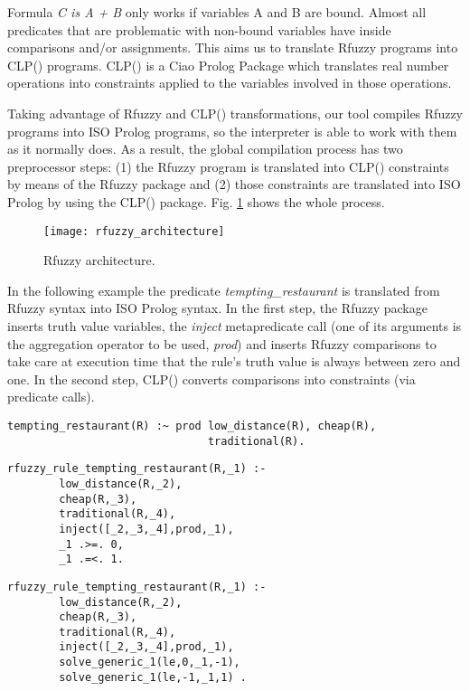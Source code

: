 \documentclass[runningheads,a4paper]{llncs}
\begin{document}
Formula {\it C is A + B} only works if variables A and B are bound.
Almost all predicates that are problematic with non-bound 
variables have inside comparisons and/or assignments. 
This aims us to translate Rfuzzy programs into CLP() 
programs. 
CLP() is a Ciao Prolog Package which translates real
number operations into constraints applied to the variables 
involved in those operations. 

Taking advantage of Rfuzzy and CLP() transformations, 
our tool compiles Rfuzzy programs into ISO Prolog programs,
so the interpreter is able to work with them as it normally does.
As a result, the global compilation process has two 
preprocessor steps:
(1) the Rfuzzy program is translated into CLP() 
constraints by means of the Rfuzzy package and 
(2) those constraints are translated into ISO Prolog by using 
the CLP() package. 
Fig. \ref{fig:rfuzzy_architecture} shows the whole process.
\begin{figure}
\centering
\texttt{[image: rfuzzy\_architecture]} 
\caption{Rfuzzy architecture.}
\label{fig:rfuzzy_architecture}
\end{figure}


In the following example the predicate {\it tempting\_restaurant}
is translated from Rfuzzy syntax into ISO Prolog syntax.
In the first step, the Rfuzzy package inserts truth value variables, 
the {\it inject} metapredicate call
(one of its arguments is the aggregation operator to be used, 
{\it prod}) 
and inserts Rfuzzy comparisons to take care at execution time 
that the rule's truth value is always between zero and one.
In the second step, CLP() converts comparisons into 
constraints (via predicate calls).

\begin{verbatim}
tempting_restaurant(R) :~ prod low_distance(R), cheap(R), 
                               traditional(R).
\end{verbatim}

\begin{verbatim}
rfuzzy_rule_tempting_restaurant(R,_1) :-
        low_distance(R,_2),
        cheap(R,_3),
        traditional(R,_4),
        inject([_2,_3,_4],prod,_1),
        _1 .>=. 0, 
        _1 .=<. 1.
\end{verbatim}

\begin{verbatim}
rfuzzy_rule_tempting_restaurant(R,_1) :-
        low_distance(R,_2),
        cheap(R,_3),
        traditional(R,_4),
        inject([_2,_3,_4],prod,_1),
        solve_generic_1(le,0,_1,-1),
        solve_generic_1(le,-1,_1,1) .
\end{verbatim}
\end{document}
